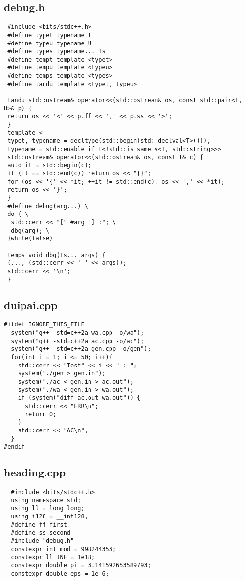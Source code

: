\documentclass[UTF8, a4paper, titlepage, twoside]{ctexart}
\begin{document}
\subsection{debug.h}
\begin{verbatim}
 #include <bits/stdc++.h>
 #define typet typename T
 #define typeu typename U
 #define types typename... Ts
 #define tempt template <typet>
 #define tempu template <typeu>
 #define temps template <types>
 #define tandu template <typet, typeu>

 tandu std::ostream& operator<<(std::ostream& os, const std::pair<T, U>& p) {
 return os << '<' << p.ff << ',' << p.ss << '>';
 } 
 template <
 typet, typename = decltype(std::begin(std::declval<T>())),
 typename = std::enable_if_t<!std::is_same_v<T, std::string>>>
 std::ostream& operator<<(std::ostream& os, const T& c) {
 auto it = std::begin(c);
 if (it == std::end(c)) return os << "{}";
 for (os << '{' << *it; ++it != std::end(c); os << ',' << *it);
 return os << '}';
 }
 #define debug(arg...) \
 do { \
  std::cerr << "[" #arg "] :"; \
  dbg(arg); \
 }while(false)

 temps void dbg(Ts... args) {
 (..., (std::cerr << ' ' << args));
 std::cerr << '\n';
 }

\end{verbatim}

\subsection{duipai.cpp}
\begin{verbatim}
#ifdef IGNORE_THIS_FILE
  system("g++ -std=c++2a wa.cpp -o/wa");
  system("g++ -std=c++2a ac.cpp -o/ac");
  system("g++ -std=c++2a gen.cpp -o/gen");
  for(int i = 1; i <= 50; i++){
    std::cerr << "Test" << i << " : ";
    system("./gen > gen.in");
    system("./ac < gen.in > ac.out");
    system("./wa < gen.in > wa.out");
    if (system("diff ac.out wa.out")) {
      std::cerr << "ERR\n";
      return 0;
    }
    std::cerr << "AC\n";
  }
#endif  
\end{verbatim}

\subsection{heading.cpp}
\begin{verbatim}
  #include <bits/stdc++.h>
  using namespace std;
  using ll = long long;
  using i128 = __int128;
  #define ff first
  #define ss second
  #include "debug.h"
  constexpr int mod = 998244353;
  constexpr ll INF = 1e18;
  constexpr double pi = 3.141592653589793;
  constexpr double eps = 1e-6;


\end{verbatim}
\end{document}
